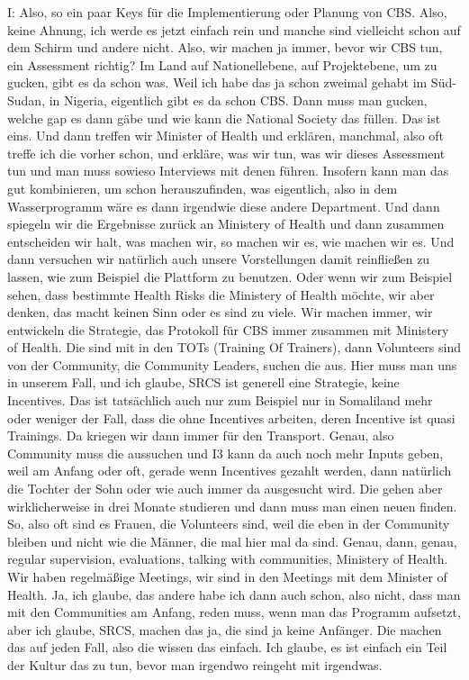 I: Also, so ein paar Keys f{\"u}r die Implementierung oder Planung von CBS. Also, keine Ahnung, ich werde es jetzt einfach rein und manche sind vielleicht schon auf dem Schirm und andere nicht. Also, wir machen ja immer, bevor wir CBS tun, ein Assessment richtig? Im Land auf Nationellebene, auf Projektebene, um zu gucken, gibt es da schon was. Weil ich habe das ja schon zweimal gehabt im S{\"u}d-Sudan, in Nigeria, eigentlich gibt es da schon CBS. Dann muss man gucken, welche gap es dann g{\"a}be und wie kann die National Society das f{\"u}llen. Das ist eins. Und dann treffen wir Minister of Health und erkl{\"a}ren, manchmal, also oft treffe ich die vorher schon, und erkl{\"a}re, was wir tun, was wir dieses Assessment tun und man muss sowieso Interviews mit denen f{\"u}hren. Insofern kann man das gut kombinieren, um schon herauszufinden, was eigentlich, also in dem Wasserprogramm w{\"a}re es dann irgendwie diese andere Department. Und dann spiegeln wir die Ergebnisse zur{\"u}ck an Ministery of Health und dann zusammen entscheiden wir halt, was machen wir, so machen wir es, wie machen wir es. Und dann versuchen wir nat{\"u}rlich auch unsere Vorstellungen damit reinfließen zu lassen, wie zum Beispiel die Plattform zu benutzen. Oder wenn wir zum Beispiel sehen, dass bestimmte Health Risks die Ministery of Health m{\"o}chte, wir aber denken, das macht keinen Sinn oder es sind zu viele. Wir machen immer, wir entwickeln die Strategie, das Protokoll f{\"u}r CBS immer zusammen mit Ministery of Health. Die sind mit in den TOTs (Training Of Trainers), dann Volunteers sind von der Community, die Community Leaders, suchen die aus. Hier muss man uns in unserem Fall, und ich glaube, SRCS ist generell eine Strategie, keine Incentives. Das ist tats{\"a}chlich auch nur zum Beispiel nur in Somaliland mehr oder weniger der Fall, dass die ohne Incentives arbeiten, deren Incentive ist quasi Trainings. Da kriegen wir dann immer f{\"u}r den Transport. Genau, also Community muss die aussuchen und I3 kann da auch noch mehr Inputs geben, weil am Anfang oder oft, gerade wenn Incentives gezahlt werden, dann nat{\"u}rlich die Tochter der Sohn oder wie auch immer da ausgesucht wird. Die gehen aber wirklicherweise in drei Monate studieren und dann muss man einen neuen finden. So, also oft sind es Frauen, die Volunteers sind, weil die eben in der Community bleiben und nicht wie die M{\"a}nner, die mal hier mal da sind. Genau, dann, genau, regular supervision, evaluations, talking with communities, Ministery of Health. Wir haben regelm{\"a}ßige Meetings, wir sind in den Meetings mit dem Minister of Health. Ja, ich glaube, das andere habe ich dann auch schon, also nicht, dass man mit den Communities am Anfang, reden muss, wenn man das Programm aufsetzt, aber ich glaube, SRCS, machen das ja, die sind ja keine Anf{\"a}nger. Die machen das auf jeden Fall, also die wissen das einfach. Ich glaube, es ist einfach ein Teil der Kultur das zu tun, bevor man irgendwo reingeht mit irgendwas. 

